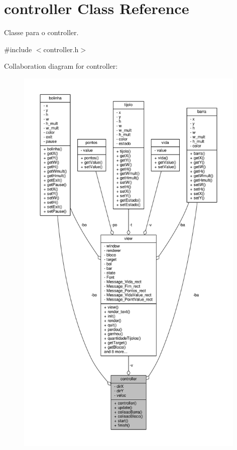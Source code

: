 \hypertarget{classcontroller}{}\section{controller Class Reference}
\label{classcontroller}


Classe para o controller.  




{\ttfamily \#include $<$controller.\+h$>$}



Collaboration diagram for controller\+:
\nopagebreak
\begin{figure}[H]
\begin{center}
\leavevmode
\includegraphics[height=550pt]{classcontroller__coll__graph}
\end{center}
\end{figure}
